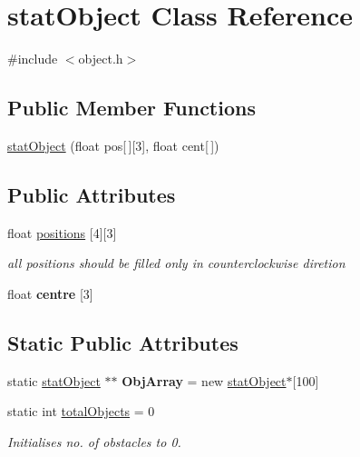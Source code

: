 \hypertarget{classstatObject}{\section{stat\-Object \-Class \-Reference}
\label{classstatObject}
}


{\ttfamily \#include $<$object.\-h$>$}

\subsection*{\-Public \-Member \-Functions}
\begin{DoxyCompactItemize}
\item 
\hyperlink{classstatObject_a6c64d66e2a449cd62b7fc78e410973b5}{stat\-Object} (float pos\mbox{[}$\,$\mbox{]}\mbox{[}3\mbox{]}, float cent\mbox{[}$\,$\mbox{]})
\end{DoxyCompactItemize}
\subsection*{\-Public \-Attributes}
\begin{DoxyCompactItemize}
\item 
\hypertarget{classstatObject_a8e67ec1897e85da518bd620c9a6eabf1}{float \hyperlink{classstatObject_a8e67ec1897e85da518bd620c9a6eabf1}{positions} \mbox{[}4\mbox{]}\mbox{[}3\mbox{]}}\label{classstatObject_a8e67ec1897e85da518bd620c9a6eabf1}

\begin{DoxyCompactList}\small\item\em all positions should be filled only in counterclockwise diretion \end{DoxyCompactList}\item 
\hypertarget{classstatObject_acee6a0f8535492e45d3c37c730910f2f}{float {\bfseries centre} \mbox{[}3\mbox{]}}\label{classstatObject_acee6a0f8535492e45d3c37c730910f2f}

\end{DoxyCompactItemize}
\subsection*{\-Static \-Public \-Attributes}
\begin{DoxyCompactItemize}
\item 
\hypertarget{classstatObject_ad078d621c0208c6bada836b4510a250e}{static \hyperlink{classstatObject}{stat\-Object} $\ast$$\ast$ {\bfseries \-Obj\-Array} = new \hyperlink{classstatObject}{stat\-Object}$\ast$\mbox{[}100\mbox{]}}\label{classstatObject_ad078d621c0208c6bada836b4510a250e}

\item 
\hypertarget{classstatObject_ac3dfe8f93fb87be216405343cdac4779}{static int \hyperlink{classstatObject_ac3dfe8f93fb87be216405343cdac4779}{total\-Objects} = 0}\label{classstatObject_ac3dfe8f93fb87be216405343cdac4779}

\begin{DoxyCompactList}\small\item\em \-Initialises no. of obstacles to 0. \end{DoxyCompactList}\end{DoxyCompactItemize}


